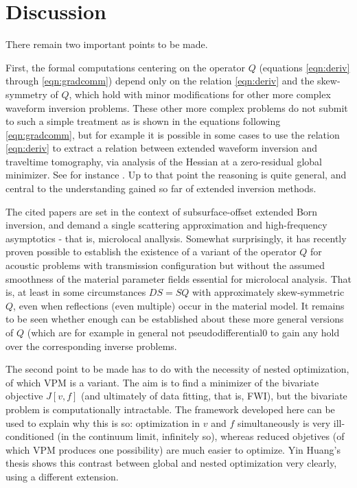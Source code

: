 \section{Discussion}
There remain two important points to be made. 

First, the formal computations centering on the operator $Q$ (equations \ref{eqn:deriv} through \ref{eqn:gradcomm}) depend only on the relation \ref{eqn:deriv} and the skew-symmetry of $Q$, which hold with minor modifications for other more complex waveform inversion problems. These other more complex problems do not submit to such a simple treatment as is shown in the equations following \ref{eqn:gradcomm}, but for example it is possible in some cases to use the relation \ref{eqn:deriv} to extract a relation between extended waveform inversion and traveltime tomography, via analysis of the Hessian at a zero-residual global minimizer. See for instance \cite{tenKroode:IPTA14,Symes:IPTA14,Symes:Madrid}. Up to that point the reasoning is quite general, and central to the understanding gained so far of extended inversion methods. 

The cited papers are set in the context of subsurface-offset extended Born inversion, and demand a single scattering approximation and high-frequency asymptotics - that is, microlocal anallysis. Somewhat surprisingly, it has recently proven possible to establish the existence of a variant of the operator $Q$ for acoustic problems with transmission configuration but without the assumed smoothness of the material parameter fields essential for microlocal analysis. That is, at least in some circumstances $DS=SQ$ with approximately skew-symmetric $Q$, even when reflections (even multiple) occur in the material model. It remains to be seen whether enough can be established about these more general versions of $Q$ (which are for example in general not pseudodifferential0 to gain any hold over the corresponding inverse problems.

The second point to be made has to do with the necessity of nested optimization, of which VPM is a variant. The aim is to find a minimizer of the bivariate objective $J[v,f]$ (and ultimately of data fitting, that is, FWI), but the bivariate problem is computationally intractable. The framework developed here can be used to explain why this is so: optimization in $v$ and $f$ simultaneously is very ill-conditioned (in the continuum limit, infinitely so), whereas reduced objetives (of which VPM produces one possibility) are much easier to optimize. Yin Huang's thesis \cite[]{YinHuang:16} shows this contrast between global and nested optimization very clearly, using a different extension.

